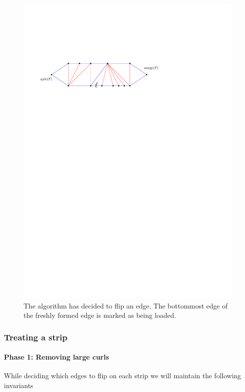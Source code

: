 \begin{figure}[h]
  \centering
  \includegraphics[scale=1]{unifiedAlgo/img/load}
  \caption{The algorithm has decided to flip an edge. The bottommost edge of the freshly formed edge is marked as being loaded. }
  \label{fig:uni:load}
\end{figure}

\subsubsection{Treating a strip}
\paragraph{Phase 1: Removing large curls}

While deciding which edges to flip on each strip we will maintain the following invariants

